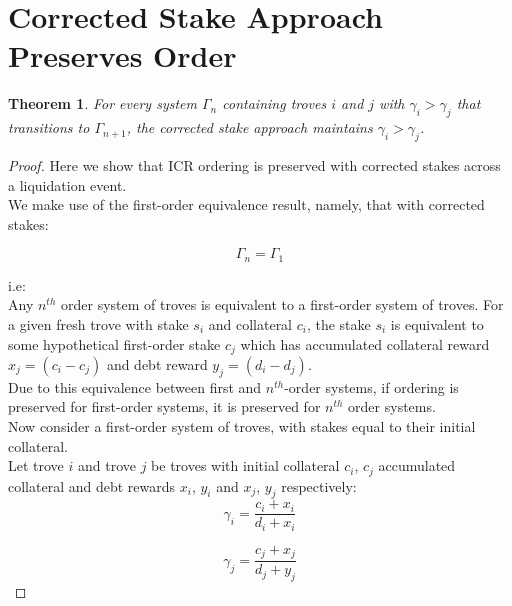 \documentclass[reqno]{article}
\newtheorem{theorem}{Theorem}[section]
\begin{document}
\section{Corrected Stake Approach Preserves Order}

\begin{theorem} \label{result:8}
  For every system $\Gamma_n$ containing troves $i$ and $j$ with $\gamma_i > \gamma_j$ that transitions to $\Gamma_{n+1}$, the corrected stake approach maintains $\gamma_i > \gamma_j$.
\end{theorem}

\begin{proof}
Here we show that ICR ordering is preserved with corrected stakes across a liquidation event.\\

We make use of the first-order equivalence result, namely, that with corrected stakes:

\begin{equation} 
    \Gamma_n = \Gamma_1
\end{equation}

i.e:\\

Any $n^{th}$ order system of troves is equivalent to a first-order system of troves. For a given fresh trove with stake $s_i$ and collateral $c_i$, the stake $s_i$ is equivalent to some hypothetical first-order stake $c_j$ which has accumulated collateral reward $x_j = (c_i - c_j)$ and debt reward $y_j = (d_i - d_j)$.\\

Due to this equivalence between first and $n^{th}$-order systems, if ordering is preserved for first-order systems, it is preserved for $n^{th}$ order systems.\\

Now consider a first-order system of troves, with stakes equal to their initial collateral.\\

Let trove $i$ and trove $j$ be troves with initial collateral $c_i$, $c_j$ accumulated collateral and debt rewards $x_i$, $y_i$ and $x_j$, $y_j$ respectively:\\

\begin{equation} 
    \gamma_i=\frac{c_i+x_i}{d_i+x_i}
\end{equation}

\begin{equation} 
    \gamma_j=\frac{c_j+x_j}{d_j+y_j}
\end{equation}


\end{proof}
\end{document}
